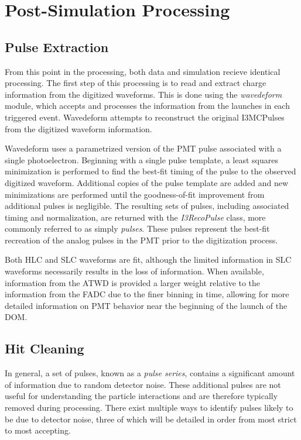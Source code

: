 \section{Post-Simulation Processing}
\subsection{Pulse Extraction}
From this point in the processing, both data and simulation recieve identical processing.
The first step of this processing is to read and extract charge information from the digitized waveforms.
This is done using the \emph{wavedeform} module, which accepts and processes the information from the launches in each triggered event.
Wavedeform attempts to reconstruct the original I3MCPulses from the digitized waveform information.

Wavedeform uses a parametrized version of the PMT pulse associated with a single photoelectron. 
Beginning with a single pulse template, a least squares minimization is performed to find the best-fit timing of the pulse to the observed digitized waveform.
Additional copies of the pulse template are added and new minimizations are performed until the goodness-of-fit improvement from additional pulses is negligible.
The resulting sets of pulses, including associated timing and normalization, are returned with the \emph{I3RecoPulse} class, more commonly referred to as simply \emph{pulses}.
These pulses represent the best-fit recreation of the analog pulses in the PMT prior to the digitization process.

Both HLC and SLC waveforms are fit, although the limited information in SLC waveforms necessarily results in the loss of information.
When available, information from the ATWD is provided a larger weight relative to the information from the FADC due to the finer binning in time, allowing for more detailed information on PMT behavior near the beginning of the launch of the DOM. 

\subsection{Hit Cleaning}
In general, a set of pulses, known as a \emph{pulse series}, contains a significant amount of information due to random detector noise.
These additional pulses are not useful for understanding the particle interactions and are therefore typically removed during processing.
There exist multiple ways to identify pulses likely to be due to detector noise, three of which will be detailed in order from most strict to most accepting.

